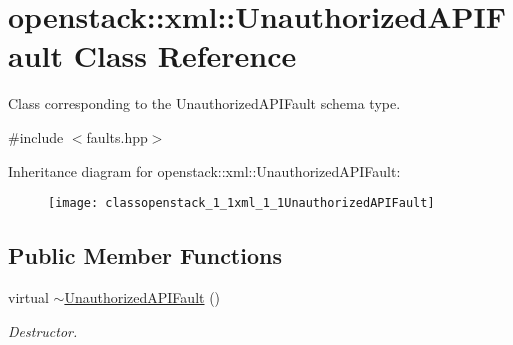 \hypertarget{classopenstack_1_1xml_1_1UnauthorizedAPIFault}{
\section{openstack::xml::UnauthorizedAPIFault Class Reference}
\label{classopenstack_1_1xml_1_1UnauthorizedAPIFault}
}


Class corresponding to the UnauthorizedAPIFault schema type.  




{\ttfamily \#include $<$faults.hpp$>$}

Inheritance diagram for openstack::xml::UnauthorizedAPIFault:\begin{figure}[H]
\begin{center}
\leavevmode
\texttt{[image: classopenstack\_1\_1xml\_1\_1UnauthorizedAPIFault]}
\end{center}
\end{figure}
\subsection*{Public Member Functions}
\begin{DoxyCompactItemize}
\item 
\hypertarget{classopenstack_1_1xml_1_1UnauthorizedAPIFault_a1e1d060383efb3b70e00b1be9082cbf2}{
virtual \hyperlink{classopenstack_1_1xml_1_1UnauthorizedAPIFault_a1e1d060383efb3b70e00b1be9082cbf2}{$\sim$UnauthorizedAPIFault} ()}
\label{classopenstack_1_1xml_1_1UnauthorizedAPIFault_a1e1d060383efb3b70e00b1be9082cbf2}

\begin{DoxyCompactList}\small\item\em Destructor. \item\end{DoxyCompactList}\end{DoxyCompactItemize}
